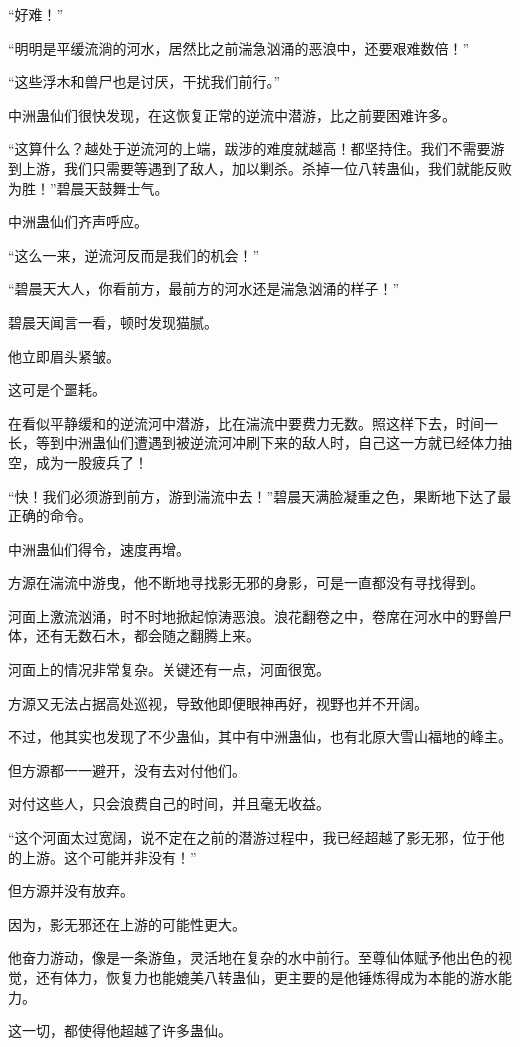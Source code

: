 \begin{this_body}
“好难！”

“明明是平缓流淌的河水，居然比之前湍急汹涌的恶浪中，还要艰难数倍！”

“这些浮木和兽尸也是讨厌，干扰我们前行。”

中洲蛊仙们很快发现，在这恢复正常的逆流中潜游，比之前要困难许多。

“这算什么？越处于逆流河的上端，跋涉的难度就越高！都坚持住。我们不需要游到上游，我们只需要等遇到了敌人，加以剿杀。杀掉一位八转蛊仙，我们就能反败为胜！”碧晨天鼓舞士气。

中洲蛊仙们齐声呼应。

“这么一来，逆流河反而是我们的机会！”

“碧晨天大人，你看前方，最前方的河水还是湍急汹涌的样子！”

碧晨天闻言一看，顿时发现猫腻。

他立即眉头紧皱。

这可是个噩耗。

在看似平静缓和的逆流河中潜游，比在湍流中要费力无数。照这样下去，时间一长，等到中洲蛊仙们遭遇到被逆流河冲刷下来的敌人时，自己这一方就已经体力抽空，成为一股疲兵了！

“快！我们必须游到前方，游到湍流中去！”碧晨天满脸凝重之色，果断地下达了最正确的命令。

中洲蛊仙们得令，速度再增。

方源在湍流中游曳，他不断地寻找影无邪的身影，可是一直都没有寻找得到。

河面上激流汹涌，时不时地掀起惊涛恶浪。浪花翻卷之中，卷席在河水中的野兽尸体，还有无数石木，都会随之翻腾上来。

河面上的情况非常复杂。关键还有一点，河面很宽。

方源又无法占据高处巡视，导致他即便眼神再好，视野也并不开阔。

不过，他其实也发现了不少蛊仙，其中有中洲蛊仙，也有北原大雪山福地的峰主。

但方源都一一避开，没有去对付他们。

对付这些人，只会浪费自己的时间，并且毫无收益。

“这个河面太过宽阔，说不定在之前的潜游过程中，我已经超越了影无邪，位于他的上游。这个可能并非没有！”

但方源并没有放弃。

因为，影无邪还在上游的可能性更大。

他奋力游动，像是一条游鱼，灵活地在复杂的水中前行。至尊仙体赋予他出色的视觉，还有体力，恢复力也能媲美八转蛊仙，更主要的是他锤炼得成为本能的游水能力。

这一切，都使得他超越了许多蛊仙。


\end{this_body}
